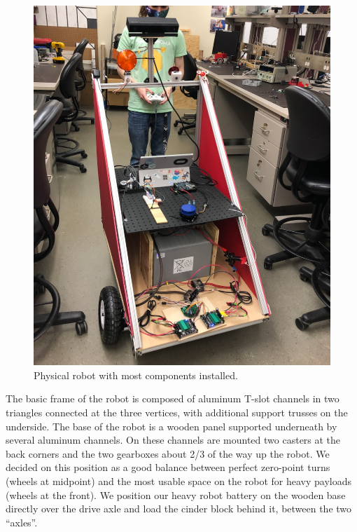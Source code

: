 \begin{figure}[h]
\begin{minipage}[b]{0.4\textwidth}
    \includegraphics[width=\textwidth]{images/frame/real.PNG}
    \caption{Physical robot with most components installed.}
  \end{minipage}
\end{figure}


The basic frame of the robot is composed of aluminum T-slot channels in two triangles connected at the three vertices, with additional support trusses on the underside. The base of the robot is a wooden panel supported underneath by several aluminum channels. On these channels are mounted two casters at the back corners and the two gearboxes about 2/3 of the way up the robot. We decided on this position as a good balance between perfect zero-point turns (wheels at midpoint) and the most usable space on the robot for heavy payloads (wheels at the front). We position our heavy robot battery on the wooden base directly over the drive axle and load the cinder block behind it, between the two ``axles''.

